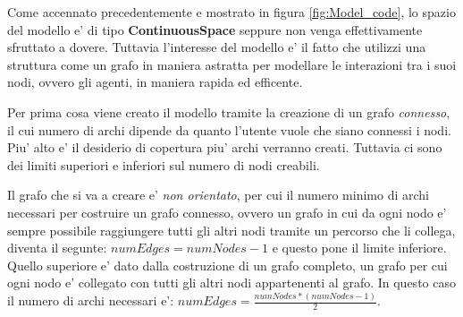 Come accennato precedentemente e mostrato in figura \ref{fig:Model_code}, lo spazio del modello 
e' di tipo \textbf{ContinuousSpace} seppure non venga effettivamente sfruttato a dovere. 
Tuttavia l'interesse del modello e' il fatto che utilizzi una struttura come un grafo in maniera
astratta per modellare le interazioni tra i suoi nodi, ovvero gli agenti, in maniera rapida ed efficente.

Per prima cosa viene creato il modello tramite la creazione di un grafo \emph{connesso}, il cui 
numero di archi dipende da quanto l'utente vuole che siano connessi i nodi. Piu' alto e' il 
desiderio di copertura piu' archi verranno creati. Tuttavia ci sono dei limiti superiori e inferiori 
sul numero di nodi creabili.

Il grafo che si va a creare e' \emph{non orientato}, per cui il numero minimo di archi necessari 
per costruire un grafo connesso, ovvero un grafo in cui da ogni nodo e' sempre possibile raggiungere
tutti gli altri nodi tramite un percorso che li collega, diventa il segunte: $numEdges = numNodes-1$
e questo pone il limite inferiore. Quello superiore e' dato dalla costruzione di un grafo completo, 
un grafo per cui ogni nodo e' collegato con tutti gli altri nodi appartenenti al grafo. In questo 
caso il numero di archi necessari e': $numEdges = \frac{numNodes*(numNodes-1)}{2}$.

